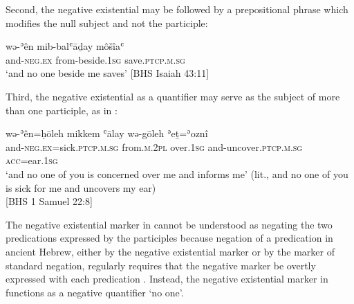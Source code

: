 \documentclass[output=paper,colorlinks,citecolor=brown,draft,draftmode]{langscibook}
\begin{document}
Second, the negative existential may be followed by a prepositional phrase
which modifies the null subject and not the participle:
%
\begin{exe}\ex \label{ex:heb-none-but-me}
    \gll wə-ʾên mib-balʿāḏay môšîaʿ \\
and-\textsc{neg.ex}   from-beside.\textsc{1sg}   save.\textsc{ptcp.m.sg} \\
    \glt `and no one beside me saves' [BHS Isaiah
43:11]
    \end{exe}
%
Third, the negative existential as a quantifier may serve as the subject of
more than one participle, as in :
%
\begin{exe}\ex \label{ex:heb-concerned}
    \gll wǝ-ʾên=ḥōleh mikkem ʿālay  wǝ-gōleh ʾeṯ=ʾoznî \\
and-\textsc{neg.ex}=sick.\textsc{ptcp.m.sg}   from.\textsc{m.2pl}
over.\textsc{1sg}  and-uncover.\textsc{ptcp.m.sg}
\textsc{acc}=ear.\textsc{1sg} \\
    \glt
`and no one of you is concerned over me and informs me' (lit., and no one
of you is sick for me and uncovers my ear)\\
[BHS 1 Samuel 22:8]
    \end{exe}
%
The negative existential
marker in  cannot be understood as negating the two
predications expressed by the participles because 
negation of a predication in ancient Hebrew, either by the negative
existential marker or by the marker of standard negation, regularly
requires that the negative marker be overtly expressed with each
 predication  \parencite[for the ways in which negation in poetry may differ from
 prose in this regard, see][]{Miller2005}. Instead, the negative
existential marker in  functions as a negative quantifier `no one'.
\end{document}
